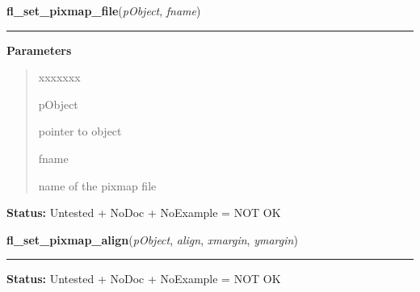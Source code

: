     \label{xformslib:library:fl_set_pixmap_file}

    \vspace{0.5ex}

\hspace{.8\funcindent}\begin{boxedminipage}{\funcwidth}

    \raggedright \textbf{fl\_set\_pixmap\_file}(\textit{pObject}, \textit{fname})

    \vspace{-1.5ex}

    \rule{\textwidth}{0.5\fboxrule}
\setlength{\parskip}{2ex}
\setlength{\parskip}{1ex}
      \textbf{Parameters}
      \vspace{-1ex}

      \begin{quote}
        \begin{Ventry}{xxxxxxx}

          \item[pObject]

          pointer to object

          \item[fname]

          name of the pixmap file

        \end{Ventry}

      \end{quote}

\textbf{Status:} Untested + NoDoc + NoExample = NOT OK



    \end{boxedminipage}

    \label{xformslib:library:fl_set_pixmap_align}

    \vspace{0.5ex}

\hspace{.8\funcindent}\begin{boxedminipage}{\funcwidth}

    \raggedright \textbf{fl\_set\_pixmap\_align}(\textit{pObject}, \textit{align}, \textit{xmargin}, \textit{ymargin})

    \vspace{-1.5ex}

    \rule{\textwidth}{0.5\fboxrule}
\setlength{\parskip}{2ex}
\setlength{\parskip}{1ex}
\textbf{Status:} Untested + NoDoc + NoExample = NOT OK



    \end{boxedminipage}

